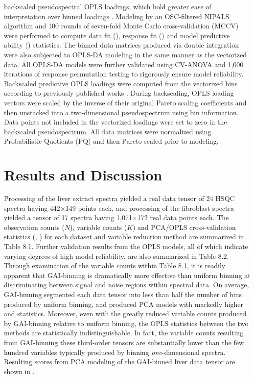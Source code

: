 \begin{doublespace}
backscaled pseudospectral OPLS loadings, which hold greater ease of
interpretation over binned loadings \cite{wiklund:anchem2008}.
Modeling by an OSC-filtered NIPALS algorithm
\cite{trygg:jchemo2002} and 100 rounds of seven-fold Monte Carlo
cross-validation (MCCV) \cite{xu:jchemo2004} were performed to
compute data fit (\rsqx{}), response fit (\rsqy{}) and model predictive ability
(\qsq{}) statistics. The binned data matrices produced via double integration
were also subjected to OPLS-DA modeling in the same manner as the vectorized
data. All OPLS-DA models were further validated using CV-ANOVA
\cite{eriksson:jchemo2008} and 1,000 iterations of response
permutation testing \cite{westerhuis:metab2008a} to rigorously ensure
model reliability. Backscaled predictive OPLS loadings were computed from the
vectorized bins according to previously published works
\cite{cloarec:anchem2005a,hedenstrom:cils2008}. During backscaling,
OPLS loading vectors were scaled by the inverse of their original Pareto
scaling coefficients and then unstacked into a two-dimensional pseudospectrum
using bin information. Data points not included in the vectorized loadings were
set to zero in the backscaled pseudospectrum. All data matrices were normalized
using Probabilistic Quotients (PQ) \cite{dieterle:anchem2006} and then
Pareto scaled \cite{vandenberg:bmcg2006} prior to modeling.
\end{doublespace}

\section{Results and Discussion}

\begin{doublespace}
Processing of the liver extract spectra yielded a real data tensor of 24
\hcnmr{} HSQC spectra having 442$\times$149 points each, and processing of the
fibroblast spectra yielded a tensor of 17 spectra having 1,071$\times$172
real data points each. The observation counts ($N$), variable counts ($K$)
and PCA/OPLS cross-validation statistics (\rsq{}, \qsq{}) for each dataset and
variable reduction method are summarized in Table 8.1. Further validation
results from the OPLS models, all of which indicate varying degrees of high
model reliability, are also summarized in Table 8.2. Through examination of the
variable counts within Table 8.1, it is readily apparent that GAI-binning is
dramatically more effective than uniform binning at discriminating between
signal and noise regions within spectral data. On average, GAI-binning
segmented each data tensor into less than half the number of bins produced by
uniform binning, and produced PCA models with markedly higher \rsqx{} and
\qsq{} statistics. Moreover, even with the greatly reduced variable counts
produced by GAI-binning relative to uniform binning, the OPLS \qsq{} statistics
between the two methods are statistically indistinguishable. In fact, the
variable counts resulting from GAI-binning these third-order tensors are
substantially lower than the few hundred variables typically produced by
binning {\it one}-dimensional spectra. Resulting scores from PCA modeling
of the GAI-binned liver data tensor are shown in .
\end{doublespace}

